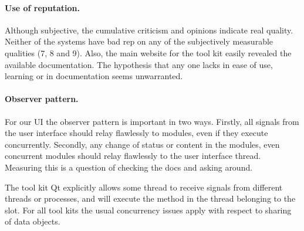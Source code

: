 \paragraph{Use of reputation.} Although subjective, the cumulative criticism and opinions
indicate real quality. Neither of the systems have bad rep on any
of the subjectively measurable qualities (7, 8 and 9). Also, the main website for
the tool kit easily revealed the available documentation. The hypothesis that any one 
lacks in ease of use, learning or in documentation seems unwarranted. 

\paragraph{Observer pattern.} For our UI the observer pattern is important in two ways.
Firstly, all signals from the user interface should relay flawlessly to modules, even if
they execute concurrently. Secondly, any change of status or content in the modules,
even concurrent modules should relay flawlessly to the user interface thread. Measuring
this is a question of checking the docs and asking around. 

The tool kit Qt explicitly allows some thread to receive signals from different
threads or processes, and will execute the method in the thread belonging to the slot.
For all tool kits the usual concurrency issues apply with respect to sharing of data objects.
